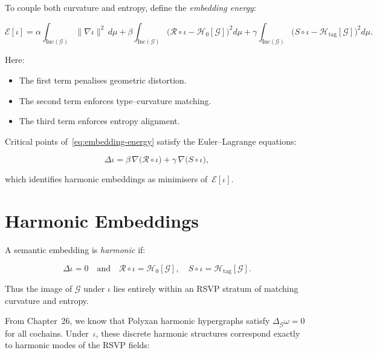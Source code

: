 To couple both curvature and entropy, define the \emph{embedding
energy}:

\begin{equation}
\label{eq:embedding-energy}
\mathcal{E}[\iota]
  = \alpha \!\int_{\mathrm{Inc}(\mathcal{G})}
       \!\lVert \nabla \iota \rVert^2 \, d\mu
    + \beta \!\int_{\mathrm{Inc}(\mathcal{G})}
       \!\big(\mathcal{R} \circ \iota - \mathcal{H}_0[\mathcal{G}]\big)^2
       d\mu
    + \gamma \!\int_{\mathrm{Inc}(\mathcal{G})}
       \!\big(S \circ \iota - \mathcal{H}_{\mathrm{tag}}[\mathcal{G}]\big)^2
       d\mu.
\end{equation}

Here:
\begin{itemize}
\item The first term penalises geometric distortion.  
\item The second term enforces type--curvature matching.  
\item The third term enforces entropy alignment.
\end{itemize}

Critical points of~\eqref{eq:embedding-energy} satisfy the Euler--Lagrange
equations:

\begin{equation}
\label{eq:embedding-euler-lagrange}
\Delta \iota 
  = \beta\, \nabla\big(\mathcal{R}\circ\iota\big)
  + \gamma\, \nabla\big(S\circ\iota\big),
\end{equation}

which identifies harmonic embeddings as minimisers of~$\mathcal{E}[\iota]$.

\section{Harmonic Embeddings}

A semantic embedding is \emph{harmonic} if:

\begin{equation}
\label{eq:harmonic}
\Delta \iota = 0
\quad\text{and}\quad
\mathcal{R}\circ\iota = \mathcal{H}_0[\mathcal{G}],
\quad
S\circ\iota = \mathcal{H}_{\mathrm{tag}}[\mathcal{G}].
\end{equation}

Thus the image of $\mathcal{G}$ under $\iota$ lies entirely within an
RSVP stratum of matching curvature and entropy.

From Chapter~26, we know that Polyxan harmonic hypergraphs satisfy
$\Delta_{\mathcal{G}} \omega = 0$ for all cochains.  
Under~$\iota$, these discrete harmonic structures correspond exactly to
harmonic modes of the RSVP fields:

